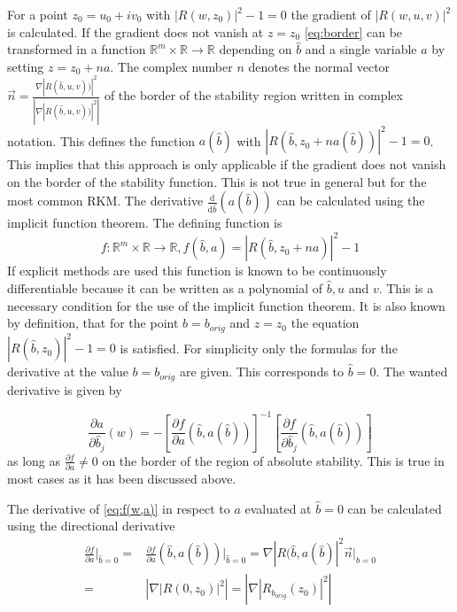 \documentclass[a4paper]{article}
\numberwithin{equation}{section}
\theoremstyle{plain}
\theoremstyle{definition}
\numberwithin{theorem}{section}
\newcommand{\R}{\mathbb{R}}
\newcommand{\1}{\mathbbm{1}}
\begin{document}
For a point $z_0= u_0 +i v_0 $ 
with $ |R(w,z_0)|^2 -1 = 0 $ the gradient of
 $|R(w,u,v)|^2$ is calculated. 
If the gradient does not vanish at $z = z_0$ \eqref{eq:border} can be transformed in a function $\R^m \times \R \rightarrow \R$ depending on $\hat{b}$ and a single variable $a$ by setting $z = z_0 + n a$. The complex number $n$ denotes the normal vector $\vec{n} = \frac{\nabla |R(\hat{b},u,v))|^2}{\left| \nabla |R(\hat{b},u,v))|^2 \right|}$ of the border of the stability region written in complex notation. This defines the function $a(\hat{b})$ with $|R(\hat{b},z_0 + n a(\hat{b}))|^2 -1 = 0$. 
This implies that this approach is only applicable if the gradient does not vanish on the border of the stability function. This is not true in general but for the most common RKM. 
The derivative $\frac{\mathrm d}{\mathrm d \hat{b}} (a(\hat{b}))$ can be calculated using the implicit function theorem. The defining function is 
\begin{equation}\label{eq:f(w,a)}
f: \R^m \times \R \rightarrow \R,  f(\hat{b},a) = |R(\hat{b},z_0 + n a)|^2 -1
\end{equation}
If explicit methods are used this function is known to be continuously differentiable because it can be written as a polynomial of $\hat{b},u$ and $v$. This is a necessary condition for the use of the implicit function theorem.
It is also known by definition, that for the point $b = b_{orig}$ and $z = z_0$ the equation $ |R(\hat{b},z_0)|^2 -1 = 0 $ is satisfied.
For simplicity only the formulas for the derivative at the value $b = b_{orig}$ are given. This corresponds to $\hat{b} = 0$.
The wanted derivative is given by 

\begin{equation}
 \frac{\partial a}{\partial \hat{b}_j} (w) =
 - \left[ \frac{\partial f}{\partial a} (\hat{b},a(\hat{b}))  \right] ^{-1} 
   \left[ \frac{\partial f}{\partial \hat{b}_j}(\hat{b},a(\hat{b})) \right]
\end{equation}
as long as $\frac{\partial f}{\partial a} \neq 0$ on the border of the region of absolute stability. This is true in most cases as it has been discussed above.

The derivative of \eqref{eq:f(w,a)} in respect to $a$ evaluated at $\hat{b}=0$ can be calculated using the directional derivative
\begin{align*}
 \frac{\partial f}{\partial a} \Big|_{\hat{b}=0} =& 
 \frac{\partial f}{\partial a} (\hat{b},a(\hat{b})) \Big|_{\hat{b}=0} = 
 \nabla |R(\hat{b},a(\hat{b})|^2 \vec{n} \Big|_{\hat{b}=0} \\
=& \left| \nabla|R(0,z_0)|^2 \right| = \left| \nabla|R_{b_{orig}}(z_0)|^2 \right|
\end{align*} 
\end{document}
